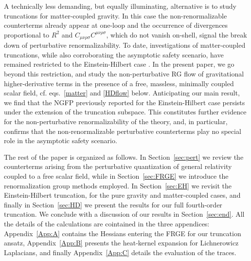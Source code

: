 \documentclass[preprint,preprintnumbers,amsmath,amssymb,nofootinbib,APS]{revtex4}
\let\m=\mu    \let\n=\nu    \let\x=\xi      \let\r=\rho \let\om=\omega
\newcommand{\2}{\sqrt{2\,}}
\begin{document}
A technically less demanding, but equally illuminating, alternative is to study truncations for matter-coupled gravity. In this case the non-renormalizable counterterms already appear at one-loop and the occurrence of divergences proportional to $R^2$ and $C_{\m\n\rho\sigma}C^{\m\n\rho\sigma}$, which do not vanish on-shell, signal the break down of perturbative  renormalizability. To date, investigations of matter-coupled truncations, while also corroborating the asymptotic safety scenario, have remained restricted to the Einstein-Hilbert case \cite{Dou:1997fg,Granda:1997xk,Percacci:2002ie,Percacci:2003jz,Codello:2008vh}.  In the present paper, we go beyond this restriction, and study the non-perturbative RG flow of gravitational higher-derivative terms in the presence of a free, massless, minimally coupled scalar field, cf. eqs.\ \eqref{matter} and \eqref{HDflow} below. Anticipating our main result, we find that the NGFP previously reported for the Einstein-Hilbert case persists under the extension of the truncation subspace. This constitutes further evidence for the non-perturbative renormalizability of the theory, and, in particular, confirms that the non-renormalizable perturbative counterterms play no special role in the asymptotic safety scenario.

The rest of the paper is organized as follows. In Section~\ref{sec:pert} we review the counterterms arising from the perturbative quantization of general relativity coupled to a free scalar field, while in Section~\ref{sec:FRGE} we introduce the renormalization group methods employed. In Section~\ref{sec:EH} we revisit the Einstein-Hilbert truncation, for the pure gravity and matter-coupled cases, and finally in Section~\ref{sec:HD} we present the results for our full fourth-order truncation. We conclude with a discussion of our results in Section~\ref{sec:end}.
All the details of the calculations are cointained in the three appendices: Appendix~\ref{App:A} contains the Hessians entering the FRGE for our truncation ansatz, Appendix~\ref{App:B} presents the heat-kernel expansion for Lichnerowicz Laplacians, and finally Appendix~\ref{App:C} 
details the evaluation of the traces.

\end{document}
